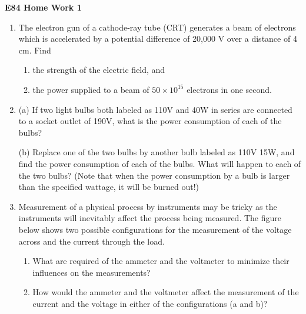 \usepackage{html}

\begin{center}
{\Large \bf E84 Home Work 1}
\end{center}
\begin{enumerate}

\item The electron gun of a cathode-ray tube (CRT) generates a beam
  of electrons which is accelerated by a potential difference of
  20,000 V over a distance of 4 cm. Find 
\begin{enumerate}
\item the strength of the electric field, and
\item the power supplied to a beam of $50\times 10^{15}$ electrons
  in one second.
\end{enumerate}

\item (a) If two light bulbs both labeled as 110V and 40W in series are
connected to a socket outlet of 190V, what is the power consumption of 
each of the bulbs?


(b) Replace one of the two bulbs by another bulb labeled as 110V 15W, and
find the power consumption of each of the bulbs. What will happen to each
of the two bulbs? (Note that when the power consumption by a bulb is larger
than the specified wattage, it will be burned out!)


\item Measurement of a physical process by instruments may be tricky as
the instruments will inevitably affect the process being measured. The 
figure below shows two possible configurations for the measurement of the
voltage across and the current through the load. 


\begin{enumerate}
\item What are required of the ammeter and the voltmeter to minimize their
	influences on the measurements? 


\item How would the ammeter and the voltmeter affect the measurement of the
	current and the voltage in either of the configurations (a and b)?
\end{enumerate}


\end{enumerate}
